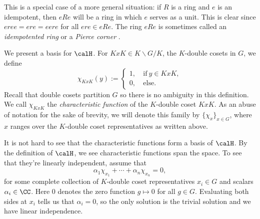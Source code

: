 \documentclass[11pt]{amsart}
\theoremstyle{remark}
\begin{document}
This is a special case of a more general situation: if $R$ is a ring and $e$ is an idempotent, then $eRe$ will be a ring in which $e$ serves as a unit.
This is clear since $eree=ere=eere$ for all $ere\in eRe$.
The ring $eRe$ is sometimes called an \emph{idempotented ring} or a \emph{Pierce corner} \cite{Bump10,Lam06}.

We present a basis for $\calH$.
For $KxK\in K\backslash G/K$, the $K$-double cosets in $G$, we define
\[
	\chi_{KxK}(y) := \begin{cases}
		1,\  & \text{if}\ y\in KxK, \\
		0,\  & \text{else}.
	\end{cases}
\]
Recall that double cosets partition $G$ so there is no ambiguity in this definition.
We call $\chi_{KxK}$ the \emph{characteristic function} of the $K$-double coset $KxK$.
As an abuse of notation for the sake of brevity, we will denote this family by $\{\chi_x\}_{x\in G}$, where $x$ ranges over the $K$-double coset representatives as written above.

It is not hard to see that the characteristic functions form a basis of $\calH$.
By the definition of $\calH$, we see characteristic functions span the space.
To see that they're linearly independent, assume that
\[
	\alpha_1 \chi_{x_1} + \cdots + \alpha_n \chi_{x_n}  = 0,
\]
for some complete collection of $K$-double coset representatives $x_i\in G$ and scalars $\alpha_i\in\CC$.
Here $0$ denotes the zero function $g\mapsto 0$ for all $g\in G$.
Evaluating both sides at $x_i$ tells us that $\alpha_i=0$, so the only solution is the trivial solution and we have linear independence.

\end{document}
